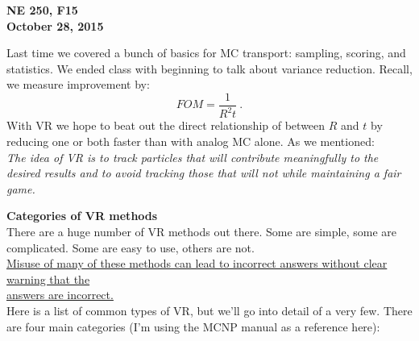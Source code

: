 \documentclass[12pt]{article}
\begin{document}
\begin{center}
{\bf NE 250, F15\\
October 28, 2015 
}
\end{center}

Last time we covered a bunch of basics for MC transport: sampling, scoring, and statistics. We ended class with beginning to talk about variance reduction. Recall, we measure improvement by:
\[
FOM =\frac{1}{R^2 t}\:.
\]
With VR we hope to beat out the direct relationship of between $R$ and $t$ by reducing one or both faster than with analog MC alone. As we mentioned:\\
\textit{The idea of VR is to track particles that will contribute meaningfully to the desired results and to avoid tracking those that will not while maintaining a fair game.}

\textbf{Categories of VR methods}\\
There are a huge number of VR methods out there. Some are simple, some are complicated. Some are easy to use, others are not. \\
\underline{Misuse of many of these methods can lead to incorrect answers without clear warning that the} \\\underline{answers are incorrect.}\\
Here is a list of common types of VR, but we'll go into detail of a very few. There are four main categories (I'm using the MCNP manual as a reference here):
%
\end{document}
